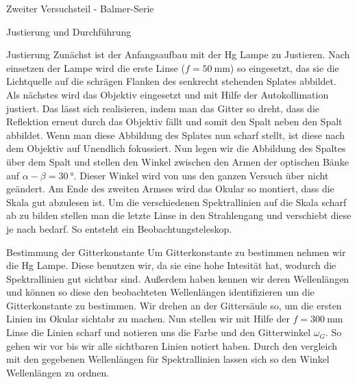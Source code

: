 \documentclass[pdftex, a4paper,11pt, twoside, ngerman]{report}
\begin{document}
\begin{chapter}{Zweiter Versuchsteil - Balmer-Serie}
\begin{section}{Justierung und Durchführung}
      \begin{subsection}{Justierung}
        \label{chp:Balmer:sec:JusitierungDurchfuehrung:subsec:Justierung}
        Zunächst ist der Anfangsaufbau mit der Hg Lampe zu Justieren. Nach
        einsetzen der Lampe wird die erste Linse ($f=\SI{50}{\milli\meter}$) 
        so eingesetzt, das sie die Lichtquelle auf die schrägen Flanken des 
        senkrecht stehenden Splates abbildet. Als nächstes wird das Objektiv 
        eingesetzt und mit Hilfe der Autokollimation justiert. Das lässt sich 
        realisieren, indem man das Gitter so dreht, dass die Reflektion erneut 
        durch das Objektiv fällt und somit den Spalt neben den Spalt abbildet. 
        Wenn man diese Abbildung des Splates nun scharf stellt, ist diese nach 
        dem Objektiv auf Unendlich fokussiert. Nun legen wir die Abbildung des 
        Spaltes über dem Spalt und stellen den Winkel zwischen den Armen der 
        optischen Bänke auf $\alpha-\beta = \SI{30}{\degree}$. Dieser Winkel 
        wird von uns den ganzen Versuch über nicht geändert. Am Ende des 
        zweiten Armses wird das Okular so montiert, dass die Skala gut 
        abzulesen ist. Um die verschiedenen Spektrallinien auf die Skala 
        scharf ab zu bilden stellen man die letzte Linse in den Strahlengang 
        und verschiebt diese je nach bedarf. So entsteht ein 
        Beobachtungsteleskop.

      \end{subsection}
      
      
      
      \begin{subsection}{Bestimmung der Gitterkonstante}
        \label{chp:Balmer:sec:JusitierungDurchfuehrung:subsec:Gitter}
        Um Gitterkonstante zu bestimmen nehmen wir die Hg Lampe. Diese benutzen
        wir, da sie eine hohe Intesität hat, wodurch die Spektrallinien gut 
        sichtbar sind. Außerdem haben kennen wir deren Wellenlängen und können 
        so diese den beobachteten Wellenlängen identifizieren um die 
        Gitterkonstante zu bestimmen. Wir drehen an der Gittersäule so, um die 
        ersten Linien im Okular sichtabr zu machen. Nun stellen wir mit Hilfe 
        der $f=\SI{300}{\milli\meter}$ Linse die Linien scharf und notieren 
        uns die Farbe und den Gitterwinkel $\omega_G$. So gehen wir vor bis 
        wir alle sichtbaren Linien notiert haben. Durch den vergleich mit den 
        gegebenen Wellenlängen für Spektrallinien lassen sich so den Winkel 
        Wellenlängen zu ordnen.
        

\end{subsection}
\end{section}
\end{chapter}
\end{document}
